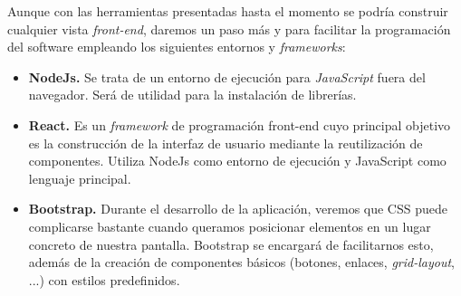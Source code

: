 \documentclass[../main.tex]{subfiles}
\begin{document}
\begin{figure}[!h]
    \centering
    \caption{}
    \label{fig:tecnlogos}
\end{figure}

Aunque con las herramientas presentadas hasta el momento se podría construir cualquier vista \textit{front-end}, daremos un paso más y para facilitar la programación del software empleando los siguientes entornos y \textit{frameworks}:

\begin{itemize}
    \item \textbf{NodeJs. }Se trata de un entorno de ejecución \cite{nodejsdef} para \textit{JavaScript} fuera del navegador. Será de utilidad para la instalación de librerías.
    \item \textbf{React.} Es un \textit{framework} \cite{reactjsdef} de programación front-end cuyo principal objetivo es la construcción de la interfaz de usuario mediante la reutilización de componentes. Utiliza NodeJs como entorno de ejecución y JavaScript como lenguaje principal.
    \item \textbf{Bootstrap. }Durante el desarrollo de la aplicación, veremos que CSS puede complicarse bastante cuando queramos posicionar elementos en un lugar concreto de nuestra pantalla. Bootstrap \cite{bootstrapdef} se encargará de facilitarnos esto, además de la creación de componentes básicos (botones, enlaces, \textit{grid-layout}, ...) con estilos predefinidos. 
\end{itemize}
\end{document}
